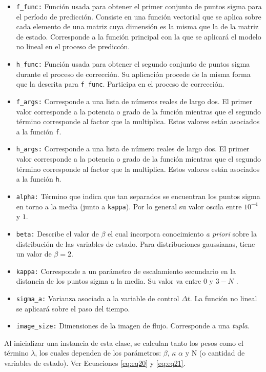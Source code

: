 \begin{itemize}
\item \texttt{f\_func:} Funci\'on usada para obtener el primer conjunto de puntos sigma para el per\'iodo de predicci\'on. Consiste en una funci\'on vectorial que se aplica sobre cada elemento de una matriz cuya dimensi\'on es la misma que la de la matriz de estado. Corresponde a la funci\'on principal con la que se aplicar\'a el modelo no lineal en el proceso de predicc\'on.
\item \texttt{h\_func:} Funci\'on usada para obtener el segundo conjunto de puntos sigma durante el proceso de correcci\'on. Su aplicaci\'on procede de la misma forma que la descrita para \texttt{f\_func}. Participa en el proceso de correcci\'on.
\item \texttt{f\_args:} Corresponde a una lista de n\'umeros reales de largo dos. El primer valor corresponde a la potencia o grado de la funci\'on mientras que el segundo t\'ermino corresponde al factor que la multiplica. Estos valores est\'an asociados a la funci\'on \texttt{f}.
\item \texttt{h\_args:} Corresponde a una lista de n\'umero reales de largo dos. El primer valor corresponde a la potencia o grado de la funci\'on mientras que el segundo t\'ermino corresponde al factor que la multiplica. Estos valores est\'an asociados a la funci\'on \texttt{h}.
\item \texttt{alpha:} T\'ermino que indica que tan separados se encuentran los puntos sigma en torno a la media (junto a \texttt{kappa}). Por lo general su valor oscila entre $10^{-4}$ y $1$. 
\item \texttt{beta:} Describe el valor de $\beta$ el cual incorpora conocimiento \textit{a priori} sobre la distribuci\'on de las variables de estado. Para distribuciones gaussianas, tiene un valor de $\beta=2$. 
\item \texttt{kappa:} Corresponde a un par\'ametro de escalamiento secundario en la distancia de los puntos sigma a la media. Su valor va entre $0$ y $3-N$ \cite{wan}.
\item \texttt{sigma\_a:} Varianza asociada a la variable de control $\Delta t$. La funci\'on no lineal se aplicar\'a sobre el paso del tiempo.
\item \texttt{image\_size:} Dimensiones de la imagen de flujo. Corresponde a una \textit{tupla}.
\end{itemize}

Al inicializar una instancia de esta clase, se calculan tanto los pesos como el t\'ermino $\lambda$, los cuales dependen de los par\'ametros: $\beta$, $\kappa$ $\alpha$ y N (o cantidad de variables de estado). Ver Ecuaciones \ref{eq:eq20} y \ref{eq:eq21}.
\bigskip

